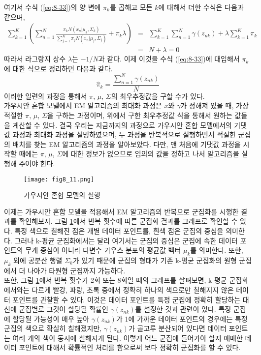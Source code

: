 \documentclass[a4paper]{oblivoir}
\begin{document}
여기서 수식 (\ref{eq:8-33})의 양 변에 $\pi_{k}$를 곱해고 모든 $k$에 대해서 더한 수식은 다음과 같으며,
\begin{eqnarray}
\sum_{k=1}^{K} (\sum_{n=1}^{N} \frac{ \pi_{k} N(x_{n}|{\mu}_{k}, {\Sigma}_{k}) }{ \sum_{j=1}^{K} \pi_{j} N(x_{n}|{\mu}_{j}, {\Sigma}_{j}) } + \pi_{k} \lambda) & = & \sum_{k=1}^{K} \sum_{n=1}^{N}  \gamma(z_{nk}) + \lambda \sum_{k=1}^{K} \pi_{k}    \nonumber  \\
& = & N + \lambda = 0 \label{eq:8-34} 
\end{eqnarray}
따라서 라그랑지 상수 $\lambda$는 $-1/N$과 같다. 이제 이것을 수식 (\ref{eq:8-33})에 대입해서 ${\pi}_{k}$에 대한 식으로 정리하면 다음과 같다. 
\begin{equation}
\hat{\pi}_{k} = \frac{\sum_{n=1}^{N} \gamma(z_{nk})}{N} \label{eq:8-36} 
\end{equation}
이러한 일련의 과정을 통해서 $\pi$, ${\mu}$, ${\Sigma}$의 최우추정값을 구할 수가 있다. \\ 

가우시안 혼합 모델에서 EM 알고리즘의 최대화 과정은 $x$와 $\gamma$가 정해져 있을 때, 가장 적절한 $\pi$, ${\mu}$, ${\Sigma}$을 구하는 과정이며, 위에서 구한 최우추정값 식을 통해서 원하는 값들을 계산할 수 있다. 결국 우리는 지금까지의 과정으로 가우시안 혼합 모델에서의 기댓값 과정과 최대화 과정을 설명하였으며, 두 과정을 반복적으로 실행하면서 적절한 군집의 배치를 찾는 EM 알고리즘의 과정을 알아보았다. 다만, 맨 처음에 기댓값 과정을 시작할 때에는 $\pi$, ${\mu}$, ${\Sigma}$에 대한 정보가 없으므로 임의의 값을 정하고 나서 알고리즘을 실행해 주어야 한다. 

\begin{figure}[ht] \centering 
\texttt{[image: fig8\_11.png]} 
\caption{가우시안 혼합 모델의 실행}
\label{fig:8-11}
\end{figure} 

이제는 가우시안 혼합 모델을 적용해서 EM 알고리즘의 반복으로 군집화를 시행한 결과를 확인해보자. 그림 \ref{fig:8-11}에서 반복 횟수에 따른 군집화 결과를 그래프로 확인할 수 있다. 특정 색으로 칠해진 점은 개별 데이터 포인트를, 흰색 점은 군집의 중심을 의미한다. 그러나 k-평균 군집화에서는 달리 여기서는 군집의 중심은 군집에 속한 데이터 포인트의 무게 중심이 아니라 다변수 가우스 분포의 평균값 벡터 $\mu_k$를 의미한다. 또한, $\mu_k$ 외에 공분산 행렬 $\Sigma_k$가 있기 때문에 군집의 형태가 기존 k-평균 군집화의 원형 군집에서 더 나아가 타원형 군집까지 가능하다. \\

또한, 그림 \ref{fig:8-11}에서 반복 횟수가 2회 또는 8회일 때의 그래프를 살펴보면, k-평균 군집화에서와는 다르게 빨강, 파랑, 초록 중에서 정확히 하나의 색으로만 칠해지지 않은 데이터 포인트를 관찰할 수 있다. 이것은 데이터 포인트를 특정 군집에 정확히 할당하는 대신에 군집별로 그것이 할당될 확률인 $\gamma(z_{nk})$를 설정한 것과 관련이 있다. 특정 군집에 할당될 가능성이 매우 높아 $\gamma(z_{nk})$가 1에 가까운 데이터 포인트의 경우에는 특정 군집의 색으로 확실히 칠해졌지만, $\gamma(z_{nk})$가 골고루 분산되어 있다면 데이터 포인트는 여러 개의 색이 동시에 칠해지게 된다. 이렇게 어느 군집에 들어가야 할지 애매한 데이터 포인트에 대해서 확률적인 처리를 함으로써 보다 정확히 군집화를 할 수 있다. \\
\end{document}
